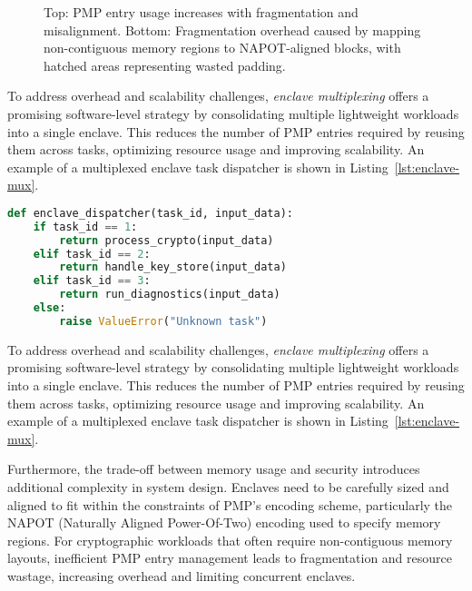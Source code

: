 \begin{figure}[htbp]

\caption{Top: PMP entry usage increases with fragmentation and misalignment. Bottom: Fragmentation overhead caused by mapping non-contiguous memory regions to NAPOT-aligned blocks, with hatched areas representing wasted padding.}
\label{fig:pmp-and-napot-fragmentation}
\end{figure}

To address overhead and scalability challenges, \emph{enclave multiplexing} \cite{Occlum2020} offers a promising software-level strategy by consolidating multiple lightweight workloads into a single enclave. This reduces the number of PMP entries required by reusing them across tasks, optimizing resource usage and improving scalability. An example of a multiplexed enclave task dispatcher is shown in Listing~\ref{lst:enclave-mux}.
\vspace{8em}
\begin{lstlisting}[language=Python, caption={Multiplexed enclave task dispatcher.}, label={lst:enclave-mux}]
def enclave_dispatcher(task_id, input_data):
    if task_id == 1:
        return process_crypto(input_data)
    elif task_id == 2:
        return handle_key_store(input_data)
    elif task_id == 3:
        return run_diagnostics(input_data)
    else:
        raise ValueError("Unknown task")
\end{lstlisting}

To address overhead and scalability challenges, \emph{enclave multiplexing} \cite{Occlum2020} offers a promising software-level strategy by consolidating multiple lightweight workloads into a single enclave. This reduces the number of PMP entries required by reusing them across tasks, optimizing resource usage and improving scalability. An example of a multiplexed enclave task dispatcher is shown in Listing~\ref{lst:enclave-mux}.

Furthermore, the trade-off between memory usage and security introduces additional complexity in system design. Enclaves need to be carefully sized and aligned to fit within the constraints of PMP's encoding scheme, particularly the NAPOT (Naturally Aligned Power-Of-Two) encoding used to specify memory regions. For cryptographic workloads that often require non-contiguous memory layouts, inefficient PMP entry management leads to fragmentation and resource wastage, increasing overhead and limiting concurrent enclaves.

